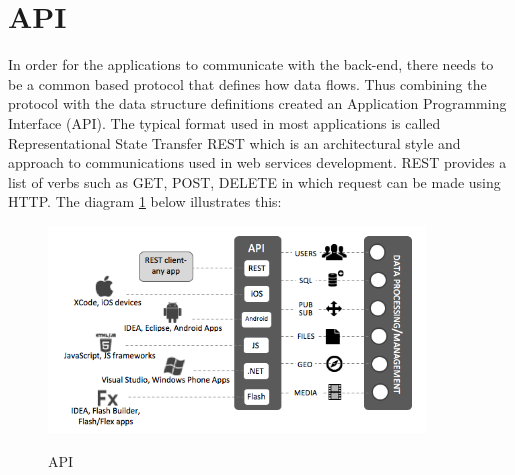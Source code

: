 \section{API}

In order for the applications to communicate with the back-end, there needs to be a common based protocol that defines how data flows. Thus combining the protocol with the data structure definitions created an Application Programming Interface (API). The typical format used in most applications is called  Representational State Transfer REST which is an architectural style and approach to communications used in web services development. REST provides a list of verbs such as GET, POST, DELETE in which request can be made using HTTP. The diagram \ref{fig:api} below illustrates this: 

\begin{figure}[!h]
    \caption{API}
    \centering
    \includegraphics[width=100mm]{images/baas-apis}
    \label{fig:api}
\end{figure}


